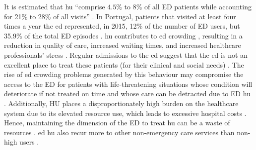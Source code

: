 \documentclass{bmcart}
\begin{document}
It is estimated that \gls{hu} ``comprise $4.5\%$ to $8\%$ of all ED patients while accounting for 21\% to 28\% of all visits'' \cite{lacalle_frequent_2010}.
In Portugal, patients that visited at least four times a year the \gls{ed} represented, in 2015, 12\% of the number of ED users, but 35.9\% of the total ED episodes \cite{catarino_utilizadores_2017}.
\gls{hu} contributes to \gls{ed} crowding \cite{moe_effectiveness_2017, lee_characteristics_2020,seguin_frequent_2018, hunt_characteristics_2006}, resulting in a reduction in quality of care, increased waiting times, and increased healthcare professionals’ stress \cite{chiu_statistical_2019, van_den_heede_interventions_2016}. 
Regular admissions to the \gls{ed} suggest that the \gls{ed} is not an excellent place to treat these patients (for their clinical and social needs) \cite{hudon_effectiveness_2016, van_den_heede_interventions_2016, ruger_analysis_2004, mandelberg_epidemiologic_2000}. 
The rise of \gls{ed} crowding problems generated by this behaviour may compromise the access to the ED for patients with life-threatening situations whose condition will deteriorate if not treated on time and whose care can be detracted due to ED \gls{hu} \cite{grimmer-somers_holistic_2010, navratil-strawn_emergency_2014, soril_reducing_2015, van_den_heede_interventions_2016, mandelberg_epidemiologic_2000, lee_utilization_2007}.
Additionally, HU places a disproportionately high burden on the healthcare system due to its elevated resource use, which leads to excessive hospital costs \cite{ruger_analysis_2004, frost_using_2017, okin_effects_2000}.
Hence, maintaining the dimension of the ED to treat \gls{hu} can be a waste of resources \cite{mandelberg_epidemiologic_2000}.  
\gls{ed} \gls{hu} also recur more to other non-emergency care services than non-high users \cite{ruger_analysis_2004, sun_predictors_2003}. 
\end{document}
